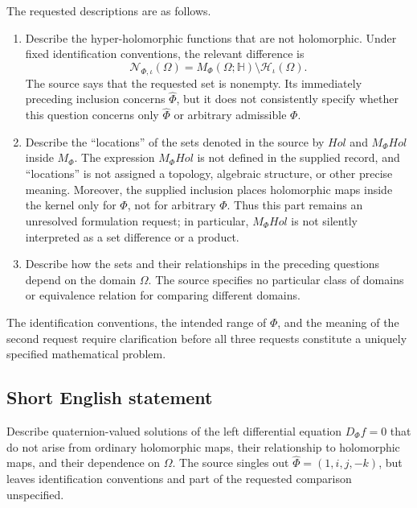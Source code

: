 \documentclass[11pt]{article}
\begin{document}
The requested descriptions are as follows.
\begin{enumerate}
\item Describe the hyper-holomorphic functions that are not holomorphic. Under fixed identification conventions, the relevant difference is
\[
\mathcal N_{\Phi,\iota}(\Omega)=M_\Phi(\Omega;\mathbb H)\setminus\mathcal H_\iota(\Omega).
\]
The source says that the requested set is nonempty. Its immediately preceding inclusion concerns \(\hat\Phi\), but it does not consistently specify whether this question concerns only \(\hat\Phi\) or arbitrary admissible \(\Phi\).
\item Describe the ``locations'' of the sets denoted in the source by \(Hol\) and \(M_\Phi Hol\) inside \(M_\Phi\). The expression \(M_\Phi Hol\) is not defined in the supplied record, and ``locations'' is not assigned a topology, algebraic structure, or other precise meaning. Moreover, the supplied inclusion places holomorphic maps inside the kernel only for \(\hat\Phi\), not for arbitrary \(\Phi\). Thus this part remains an unresolved formulation request; in particular, \(M_\Phi Hol\) is not silently interpreted as a set difference or a product.
\item Describe how the sets and their relationships in the preceding questions depend on the domain \(\Omega\). The source specifies no particular class of domains or equivalence relation for comparing different domains.
\end{enumerate}
The identification conventions, the intended range of \(\Phi\), and the meaning of the second request require clarification before all three requests constitute a uniquely specified mathematical problem.
\subsection{Short English statement}
Describe quaternion-valued solutions of the left differential equation \(D_\Phi f=0\) that do not arise from ordinary holomorphic maps, their relationship to holomorphic maps, and their dependence on \(\Omega\). The source singles out \(\hat\Phi=(1,i,j,-k)\), but leaves identification conventions and part of the requested comparison unspecified.
\end{document}

